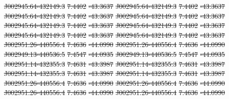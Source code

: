 \documentclass[11pt, a4paper]{book}
\providecommand{\DIFdeltex}[1]{{\protect\color{red}\sout{#1}}}                      %
\providecommand{\DIFdel}[1]{\texorpdfstring{\DIFdeltex{#1}}{}} %
\begin{document}
\DIFdel{J002945.64-432149.3 }%
\DIFdel{7.4402 }%
\DIFdel{-43.3637 }%
\DIFdel{J002945.64-432149.3 }%
\DIFdel{7.4402 }%
\DIFdel{-43.3637 }%
\DIFdel{J002945.64-432149.3 }%
\DIFdel{7.4402 }%
\DIFdel{-43.3637 }%
\DIFdel{J002945.64-432149.3 }%
\DIFdel{7.4402 }%
\DIFdel{-43.3637 }%
\DIFdel{J002945.64-432149.3 }%
\DIFdel{7.4402 }%
\DIFdel{-43.3637 }%
\DIFdel{J002945.64-432149.3 }%
\DIFdel{7.4402 }%
\DIFdel{-43.3637 }%
\DIFdel{J002945.64-432149.3 }%
\DIFdel{7.4402 }%
\DIFdel{-43.3637 }%
\DIFdel{J002945.64-432149.3 }%
\DIFdel{7.4402 }%
\DIFdel{-43.3637 }%
\DIFdel{J002951.26-440556.4 }%
\DIFdel{7.4636 }%
\DIFdel{-44.0990 }%
\DIFdel{J002951.26-440556.4 }%
\DIFdel{7.4636 }%
\DIFdel{-44.0990 }%
\DIFdel{J002949.13-440536.5 }%
\DIFdel{7.4547 }%
\DIFdel{-44.0935 }%
\DIFdel{J002949.13-440536.5 }%
\DIFdel{7.4547 }%
\DIFdel{-44.0935 }%
\DIFdel{J002951.14-432355.3 }%
\DIFdel{7.4631 }%
\DIFdel{-43.3987 }%
\DIFdel{J002951.14-432355.3 }%
\DIFdel{7.4631 }%
\DIFdel{-43.3987 }%
\DIFdel{J002951.14-432355.3 }%
\DIFdel{7.4631 }%
\DIFdel{-43.3987 }%
\DIFdel{J002951.14-432355.3 }%
\DIFdel{7.4631 }%
\DIFdel{-43.3987 }%
\DIFdel{J002951.26-440556.4 }%
\DIFdel{7.4636 }%
\DIFdel{-44.0990 }%
\DIFdel{J002951.26-440556.4 }%
\DIFdel{7.4636 }%
\DIFdel{-44.0990 }%
\DIFdel{J002951.26-440556.4 }%
\DIFdel{7.4636 }%
\DIFdel{-44.0990 }%
\DIFdel{J002951.26-440556.4 }%
\DIFdel{7.4636 }%
\DIFdel{-44.0990 }%
\end{document}
